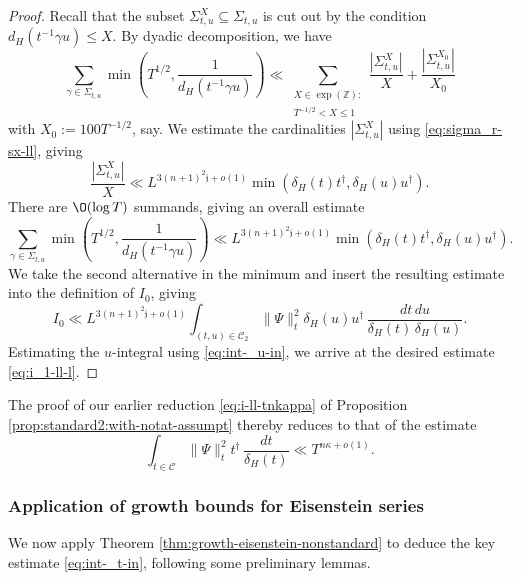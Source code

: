 \begin{proof}
  Recall that the subset $\Sigma_{t,u}^X \subseteq \Sigma_{t,u}$ is cut out by the condition $d_H(t^{-1} \gamma u) \leq X$.  By dyadic decomposition, we have
  \begin{equation*}
    \sum_{\gamma \in \Sigma_{t,u}}
    \min \left( T^{1/2}, \frac{1}{d_H(t^{-1} \gamma u)} \right) \ll  \sum_{
      \substack{
        X \in \exp(\mathbb{Z}) :  \\
        T^{-1/2} < X \leq 1
      }
    }
    \frac{| \Sigma_{t,u}^X|}{X}
    +
    \frac{|\Sigma_{t,u}^{X_0}|}{X_0}
  \end{equation*}
  with $X_0 := 100 T^{-1/2}$, say.  We estimate the cardinalities $|\Sigma_{t,u}^X|$ using \eqref{eq:sigma_r-sx-ll}, giving
  \begin{equation*}
    \frac{|\Sigma_{t,u}^X|}{X} \ll L^{3(n+1)^2 \mathfrak{j} + o(1)} \min(\delta_H(t) t^\dagger, \delta_H(u) u^\dagger).
  \end{equation*}
  There are $\O(\log T)$ summands, giving an overall estimate
  \begin{equation*}
    \sum_{\gamma \in \Sigma_{t,u}}
    \min \left( T^{1/2}, \frac{1}{d_H(t^{-1} \gamma u)} \right)
    \ll L^{3(n+1)^2\mathfrak{j} + o(1)} \min(\delta_H(t) t^\dagger, \delta_H(u) u^\dagger).
  \end{equation*}
  We take the second alternative in the minimum and insert the resulting estimate into the definition of $I_0$, giving
  \begin{equation*}
    I_0
    \ll
    L^{3(n+1)^2 \mathfrak{j} + o(1)}
    \int_{(t, u) \in \mathcal{C}_2 } \|\Psi\|_t^2
    \delta_H(u) u^\dagger \, \frac{d t \, d u}{\delta_H(t) \, \delta_H(u)}.
  \end{equation*}
  Estimating the $u$-integral using \eqref{eq:int-_u-in}, we arrive at the desired estimate \eqref{eq:i_1-ll-l}.
\end{proof}

The proof of our earlier reduction \eqref{eq:i-ll-tnkappa} of  Proposition \ref{prop:standard2:with-notat-assumpt} thereby reduces to that of the estimate
\begin{equation}\label{eq:int-_t-in}
  \int_{t \in \mathcal{C} } \|\Psi\|_t^2
  t^\dagger  \, \frac{d t}{\delta_H(t)}
  \ll
  T^{n \kappa + o(1)}.
\end{equation}

\subsubsection{Application of growth bounds for Eisenstein series}\label{sec:appl-growth-bounds}
We now apply Theorem \ref{thm:growth-eisenstein-nonstandard} to deduce the key estimate \eqref{eq:int-_t-in}, following some preliminary lemmas.

